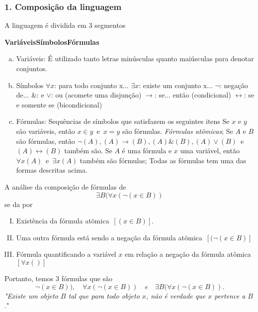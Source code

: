 \subsubsection*{1. Composição da linguagem}
A linguagem é dividida em 3 segmentos
\begin{center}
  \textbf{Variáveis}\quad \textbf{Símbolos}\quad \textbf{Fórmulas} 
\end{center}
\begin{enumerate}[a)]
    \item Variáveis: É utilizado tanto letras minúsculas quanto maiúsculas para denotar conjuntos.
    \item Símbolos  
      \subitem $\forall x$: para todo conjunto x...
      \subitem $\exists x$: existe um conjunto x...
      \subitem $\neg$: negação de...
      \subitem $\&$: e
      \subitem $\lor$: ou (acomete uma disjunção)
      \subitem $\rightarrow$: se... então (condicional)
      \subitem $\leftrightarrow$: se e somente se (bicondicional)
    \item Fórmulas: Sequências de símbolos que satisfazem os seguintes itens
        \subitem Se $x$ e $y$ são variáveis, então $x \in y$\ e\ $x = y$ são fórmulas. \textit{Fórmulas atômicas};
        \subitem Se $A$ e $B$ são fórmulas, então $\neg(A), (A) \rightarrow (B), (A) \& (B), (A) \lor (B)$\ e\ $(A) \leftrightarrow (B)$ também são.
        \subitem Se $A$ é uma fórmula e $x$ uma variável, então $\forall x(A)$\ e\ $\exists x(A)$ também são fórmulas;
        \subitem Todas as fórmulas tem uma das formas descritas acima.
\end{enumerate}
\begin{exmp}
    A análise da composição de fórmulas de
    $$\exists B(\forall x(\neg(x \in B))$$
    se da por
\begin{enumerate}[I.]
    \item Existência da fórmula atõmica\ $[(x \in B)]$.
    \item Uma outra fórmula está sendo a negação da fórmula atõmica\ $[(\neg(x \in B)]$
    \item Fórmula quantificando a variável $x$ em relação a negação da fórmula atômica\ $[\forall x()]$
\end{enumerate}
Portanto, temos 3 fórmulas que são $$\neg(x \in B)),\quad \forall x(\neg(x \in B)) \quad e\quad \exists B (\forall x(\neg(x \in B)).$$
\textit{"Existe um objeto $B$ tal que para todo objeto $x$, não é verdade que $x$ pertence a $B$}."
\end{exmp}
